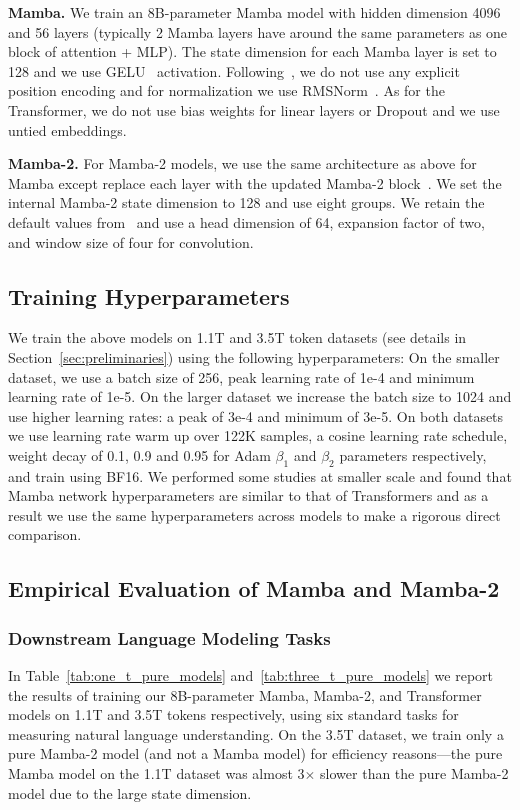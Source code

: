 \textbf{Mamba.} We train an 8B-parameter Mamba model with hidden dimension 4096 and 56 layers (typically 2 Mamba layers have around the same parameters as one block of attention + MLP). The state dimension for each Mamba layer is set to 128 and we use GELU~\citep{hendrycks2016gaussian} activation. Following~\citep{gu2023mamba}, we do not use any explicit position encoding and for normalization we use RMSNorm~\citep{zhang2019root}. As for the Transformer, we do not use bias weights for linear layers or Dropout and we use untied embeddings. 

\textbf{Mamba-2.} For Mamba-2 models, we use the same architecture as above for Mamba except replace each layer with the updated Mamba-2 block~\citep{dao2024transformers}. We set the internal Mamba-2 state dimension to 128 and use eight groups. We retain the default values from~\cite{dao2024transformers} and use a head dimension of 64, expansion factor of two, and window size of four for convolution.

\subsection{Training Hyperparameters} We train the above models on 1.1T and 3.5T token datasets (see details in Section~\ref{sec:preliminaries}) using the following hyperparameters: On the smaller dataset, we use a batch size of 256, peak learning rate of 1e-4 and minimum learning rate of 1e-5. On the larger dataset we increase the batch size to 1024 and use higher learning rates: a peak of 3e-4 and minimum of 3e-5. On both datasets we use learning rate warm up over 122K samples, a cosine learning rate schedule, weight decay of 0.1, 0.9 and 0.95 for Adam $\beta_1$ and $\beta_2$ parameters respectively, and train using BF16. We performed some studies at smaller scale and found that Mamba network hyperparameters are similar to that of Transformers and as a result we use the same hyperparameters across models to make a rigorous direct comparison.

\subsection{Empirical Evaluation of Mamba and Mamba-2}
\label{subsec:pure_model_eval}

\subsubsection{Downstream Language Modeling Tasks}
\label{subsec:downstream_eval}
In Table~\ref{tab:one_t_pure_models} and~\ref{tab:three_t_pure_models} we report the results of training our 8B-parameter Mamba, Mamba-2, and Transformer models on 1.1T and 3.5T tokens respectively, using six standard tasks for measuring natural language understanding. On the 3.5T dataset, we train only a pure Mamba-2 model (and not a Mamba model) for efficiency reasons---the pure Mamba model on the 1.1T dataset was almost 3$\times$ slower than the pure Mamba-2 model due to the large state dimension. 

